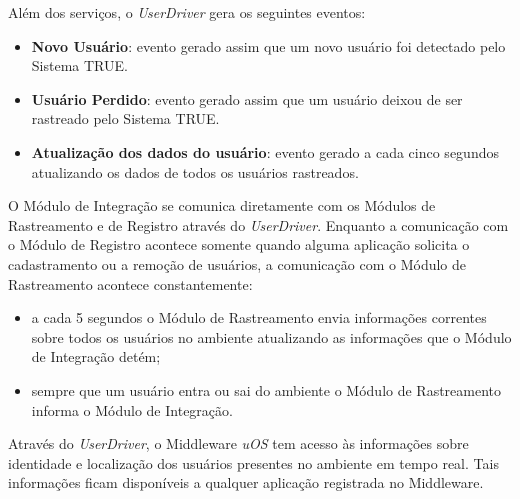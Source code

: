 Além dos serviços, o \textit{UserDriver} gera os seguintes eventos:

	\begin{itemize}
		\item \textbf{Novo Usuário}: evento gerado assim que um novo usuário foi detectado pelo Sistema TRUE.
		\item \textbf{Usuário Perdido}: evento gerado assim que um usuário deixou de ser rastreado pelo Sistema TRUE.
		\item \textbf{Atualização dos dados do usuário}: evento gerado a cada cinco segundos atualizando os dados de todos os usuários rastreados.
	\end{itemize}

	O Módulo de Integração se comunica diretamente com os Módulos de Rastreamento e de
	Registro através do \textit{UserDriver}. Enquanto a comunicação com o Módulo de
	Registro acontece somente quando alguma aplicação solicita o cadastramento ou a remoção
	de usuários, a comunicação com o Módulo de Rastreamento acontece constantemente:

	\begin{itemize}
		\item a cada 5 segundos o Módulo de Rastreamento envia informações correntes sobre todos os usuários no ambiente atualizando as informações que o Módulo de Integração detém;
		\item sempre que um usuário entra ou sai do ambiente o Módulo de Rastreamento informa o Módulo de Integração.
	\end{itemize} 

Através do \textit{UserDriver}, o Middleware \textit{uOS} tem acesso às informações sobre identidade e localização dos usuários presentes no ambiente em tempo real. Tais informações ficam disponíveis a qualquer aplicação registrada no Middleware. 
